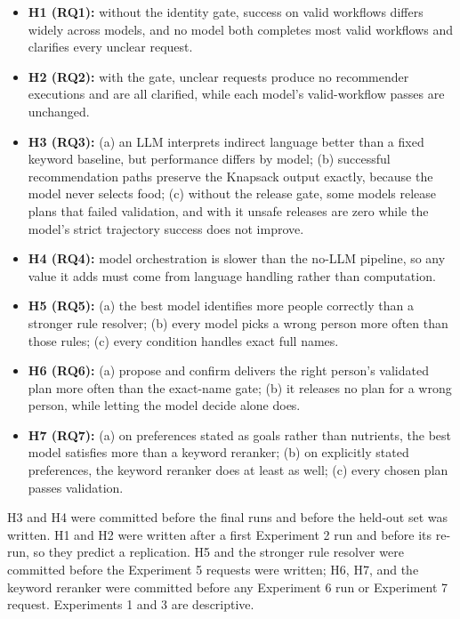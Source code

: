 \documentclass[
  10pt,
  letterpaper,
]{article}
\providecommand{\tightlist}{%
  \setlength{\itemsep}{0pt}\setlength{\parskip}{0pt}}
\begin{document}
\begin{itemize}
\tightlist
\item
  \textbf{H1 (RQ1):} without the identity gate, success on valid
  workflows differs widely across models, and no model both completes
  most valid workflows and clarifies every unclear request.
\item
  \textbf{H2 (RQ2):} with the gate, unclear requests produce no
  recommender executions and are all clarified, while each model's
  valid-workflow passes are unchanged.
\item
  \textbf{H3 (RQ3):} (a) an LLM interprets indirect language better than
  a fixed keyword baseline, but performance differs by model; (b)
  successful recommendation paths preserve the Knapsack output exactly,
  because the model never selects food; (c) without the release gate,
  some models release plans that failed validation, and with it unsafe
  releases are zero while the model's strict trajectory success does not
  improve.
\item
  \textbf{H4 (RQ4):} model orchestration is slower than the no-LLM
  pipeline, so any value it adds must come from language handling rather
  than computation.
\item
  \textbf{H5 (RQ5):} (a) the best model identifies more people correctly
  than a stronger rule resolver; (b) every model picks a wrong person
  more often than those rules; (c) every condition handles exact full
  names.
\item
  \textbf{H6 (RQ6):} (a) propose and confirm delivers the right person's
  validated plan more often than the exact-name gate; (b) it releases no
  plan for a wrong person, while letting the model decide alone does.
\item
  \textbf{H7 (RQ7):} (a) on preferences stated as goals rather than
  nutrients, the best model satisfies more than a keyword reranker; (b)
  on explicitly stated preferences, the keyword reranker does at least
  as well; (c) every chosen plan passes validation.
\end{itemize}

H3 and H4 were committed before the final runs and before the held-out
set was written. H1 and H2 were written after a first Experiment 2 run
and before its re-run, so they predict a replication. H5 and the
stronger rule resolver were committed before the Experiment 5 requests
were written; H6, H7, and the keyword reranker were committed before any
Experiment 6 run or Experiment 7 request. Experiments 1 and 3 are
descriptive.
\end{document}
